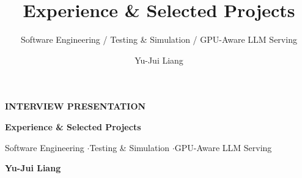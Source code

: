 \documentclass[aspectratio=169,10pt]{beamer}
\title[Interview Presentation]{Experience \& Selected Projects}
\subtitle{Software Engineering / Testing \& Simulation / GPU-Aware LLM Serving}
\author{Yu-Jui Liang}
\institute{National Taiwan University}
\date{}
\begin{document}
{
\begin{frame}[plain]
  \vspace*{0.82cm}
  {\normalsize\bfseries\color{Accent}INTERVIEW PRESENTATION}\par
  \vspace{0.48cm}
  {\raggedright\fontsize{20}{24}\selectfont\bfseries\color{Ink}
    Experience \& Selected Projects\par}
  \vspace{0.34cm}
  {\color{Muted}\fontsize{11}{14}\selectfont Software Engineering \enspace$\cdot$\enspace Testing \& Simulation \enspace$\cdot$\enspace GPU-Aware LLM Serving\par}
  \vspace{0.72cm}
  {\fontsize{18}{22}\selectfont\bfseries Yu-Jui Liang}\par
  \vfill
\end{frame}}
\end{document}
